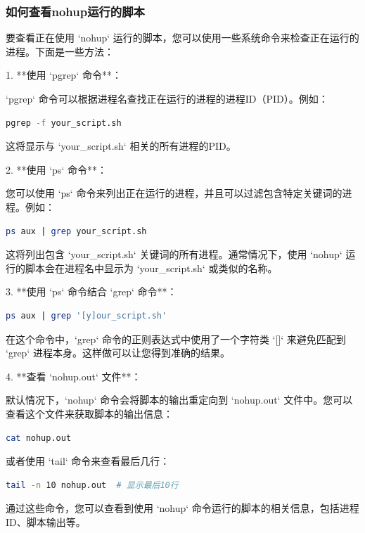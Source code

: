 \subsubsection{如何查看nohup运行的脚本}
要查看正在使用 `nohup` 运行的脚本，您可以使用一些系统命令来检查正在运行的进程。下面是一些方法：

1. **使用 `pgrep` 命令**：

   `pgrep` 命令可以根据进程名查找正在运行的进程的进程ID（PID）。例如：

\begin{lstlisting}[language=sh]
   pgrep -f your_script.sh
\end{lstlisting}
 这将显示与 `your\_script.sh` 相关的所有进程的PID。


2. **使用 `ps` 命令**：

   您可以使用 `ps` 命令来列出正在运行的进程，并且可以过滤包含特定关键词的进程。例如：

\begin{lstlisting}[language=sh]
   ps aux | grep your_script.sh
\end{lstlisting}
   这将列出包含 `your\_script.sh` 关键词的所有进程。通常情况下，使用 `nohup` 运行的脚本会在进程名中显示为 `your\_script.sh` 或类似的名称。


3. **使用 `ps` 命令结合 `grep` 命令**：

\begin{lstlisting}[language=sh]
   ps aux | grep '[y]our_script.sh'
\end{lstlisting}
在这个命令中，`grep` 命令的正则表达式中使用了一个字符类 `[]` 来避免匹配到 `grep` 进程本身。这样做可以让您得到准确的结果。

4. **查看 `nohup.out` 文件**：

   默认情况下，`nohup` 命令会将脚本的输出重定向到 `nohup.out` 文件中。您可以查看这个文件来获取脚本的输出信息：

\begin{lstlisting}[language=sh]
   cat nohup.out
\end{lstlisting}
   或者使用 `tail` 命令来查看最后几行：

\begin{lstlisting}[language=sh]
   tail -n 10 nohup.out  # 显示最后10行
\end{lstlisting}
通过这些命令，您可以查看到使用 `nohup` 命令运行的脚本的相关信息，包括进程ID、脚本输出等。



